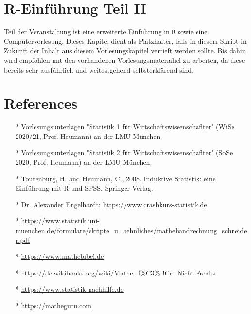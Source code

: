 \documentclass[a4paper]{article}
\begin{document}

\section{R-Einführung Teil II}

Teil der Veranstaltung ist eine erweiterte Einführung in \texttt{R} sowie eine Computervorlesung. Dieses Kapitel dient als Platzhalter, falls in diesem Skript in Zukunft der Inhalt aus diesem Vorlesungskapitel vertieft werden sollte. Bis dahin wird empfohlen mit den vorhandenen Vorlesungsmaterialiel zu arbeiten, da diese bereits sehr ausführlich und weitestgehend selbsterklärend sind.


\clearpage


\section*{References}

\begin{itemize}
    \item[*] Vorlesungsunterlagen "Statistik 1 für Wirtschaftswissenschaflter" (WiSe 2020/21, Prof. Heumann) an der LMU München.
    \item[*] Vorlesungsunterlagen "Statistik 2 für Wirtschaftswissenschaflter" (SoSe 2020, Prof. Heumann) an der LMU München.
    \item[*] Toutenburg, H. and Heumann, C., 2008. Induktive Statistik: eine Einführung mit R und SPSS. Springer-Verlag.
    \item[*] Dr. Alexander Engelhardt: \url{https://www.crashkurs-statistik.de}
    \item[*] \url{https://www.statistik.uni-muenchen.de/formulare/skripte_u_aehnliches/mathehandrechnung_schneider.pdf}
    \item[*] \url{https://www.mathebibel.de}
    \item[*] \url{https://de.wikibooks.org/wiki/Mathe_f\%C3\%BCr_Nicht-Freaks}
    \item[*] \url{https://www.statistik-nachhilfe.de}
    \item[*] \url{https://matheguru.com}
\end{itemize}
\end{document}

